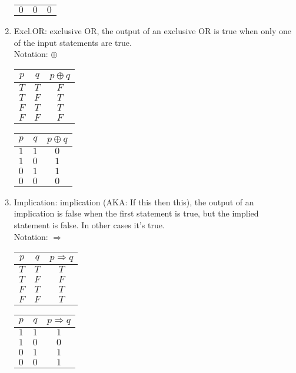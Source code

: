 \documentclass{article}
\begin{document}
\begin{enumerate}[label=Def. \arabic*:, leftmargin=3.5em, align=left]
\begin{tabular}{cc|c}
    $0$ & $0$ & $0$ \\
  \end{tabular}
  \item Excl.OR: exclusive OR, the output of an exclusive OR is true when only one of the input statements are true.\\
  Notation: $\oplus$
  \vspace{.25cm}\\
  \begin{tabular}{cc|c}
    $p$ & $q$ & $p \oplus q$ \\ \hline 
    $T$ & $T$ & $F$ \\
    $T$ & $F$ & $T$ \\
    $F$ & $T$ & $T$ \\
    $F$ & $F$ & $F$ \\
  \end{tabular} \qquad
  \begin{tabular}{cc|c}
    $p$ & $q$ & $p \oplus q$ \\ \hline 
    $1$ & $1$ & $0$ \\
    $1$ & $0$ & $1$ \\
    $0$ & $1$ & $1$ \\
    $0$ & $0$ & $0$ \\
  \end{tabular}
  \item Implication: implication (AKA: If this then this), the output of an implication is false when the first statement is true, but the implied statement is false. In other cases it's true.\\
  Notation: $\Rightarrow$
  \vspace{.25cm}\\
  \begin{tabular}{cc|c}
    $p$ & $q$ & $p \Rightarrow q$ \\ \hline 
    $T$ & $T$ & $T$ \\
    $T$ & $F$ & $F$ \\
    $F$ & $T$ & $T$ \\
    $F$ & $F$ & $T$ \\
  \end{tabular} \qquad
  \begin{tabular}{cc|c}
    $p$ & $q$ & $p \Rightarrow q$ \\ \hline 
    $1$ & $1$ & $1$ \\
    $1$ & $0$ & $0$ \\
    $0$ & $1$ & $1$ \\
    $0$ & $0$ & $1$ \\

\end{tabular}
\end{enumerate}
\end{document}
